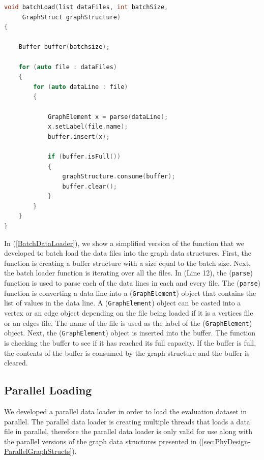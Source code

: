 {\lstset{style=mystyle}


\begin{lstlisting}[language=C++, caption=Function used for batch loading of data files., label=BatchDataLoader]
void batchLoad(list dataFiles, int batchSize, 
     GraphStruct graphStructure) 
{
       
    Buffer buffer(batchsize);

    for (auto file : dataFiles) 
    {
        for (auto dataLine : file) 
        {

            GraphElement x = parse(dataLine);
            x.setLabel(file.name);
            buffer.insert(x);

            if (buffer.isFull()) 
            {
                graphStructure.consume(buffer);
                buffer.clear();
            }
        }
    }
}

\end{lstlisting}

In (\ref{BatchDataLoader}), we show a simplified version of the function that we developed to batch load the data files into the graph data structures. First, the function is creating a buffer structure with a size equal to the batch size. Next, the batch loader function is iterating over all the files. In (Line 12), the (\texttt{parse}) function  is used to parse each of the data lines in each and every file. The (\texttt{parse}) function is converting a data line into a (\texttt{GraphElement}) object that contains the list of values in the data line. A (\texttt{GraphElement}) object can be casted into a vertex or an edge object depending on the file being loaded if it is a vertices file or an edges file. The name of the file is used as the label of the (\texttt{GraphElement}) object. Next, the (\texttt{GraphElement}) object is inserted into the buffer. The function is checking the buffer to see if it has reached its full capacity. If the buffer is full, the contents of the buffer is consumed by the graph structure and the buffer is cleared.

\subsection{Parallel Loading}
\label{subsec:parallellLoading}

We developed a parallel data loader in order to load the evaluation dataset in parallel. The parallel data loader is creating multiple threads that loads a data file in parallel, therefore the parallel data loader is only valid for use along with the parallel versions of the graph data structures presented in (\ref{sec:PhyDesign-ParallelGraphStructs}). 

}
